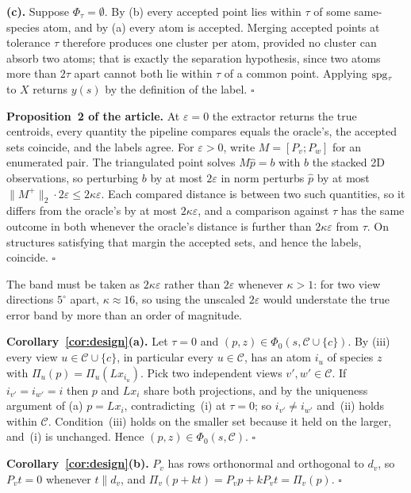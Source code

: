 \textbf{(c).} Suppose $\Phi_\tau = \emptyset$. By (b) every accepted point lies within $\tau$ of some
same-species atom, and by (a) every atom is accepted. Merging accepted points at tolerance $\tau$ therefore
produces one cluster per atom, provided no cluster can absorb two atoms; that is exactly the separation
hypothesis, since two atoms more than $2\tau$ apart cannot both lie within $\tau$ of a common point.
Applying $\mathrm{spg}_\tau$ to $X$ returns $y(s)$ by the definition of the label. \hfill$\square$

\textbf{Proposition~2 of the article.} At $\varepsilon = 0$ the extractor returns the true centroids, every
quantity the pipeline compares equals the oracle's, the accepted sets coincide, and the labels agree. For
$\varepsilon > 0$, write $M = [P_v; P_w]$ for an enumerated pair. The triangulated point solves
$M \hat p = b$ with $b$ the stacked 2D observations, so perturbing $b$ by at most $2\varepsilon$ in norm
perturbs $\hat p$ by at most $\|M^{+}\|_2 \cdot 2\varepsilon \le 2\kappa\varepsilon$. Each compared
distance is between two such quantities, so it differs from the oracle's by at most $2\kappa\varepsilon$,
and a comparison against $\tau$ has the same outcome in both whenever the oracle's distance is further than
$2\kappa\varepsilon$ from $\tau$. On structures satisfying that margin the accepted sets, and hence the
labels, coincide. \hfill$\square$

The band must be taken as $2\kappa\varepsilon$ rather than $2\varepsilon$ whenever $\kappa > 1$: for two view
directions $5^\circ$ apart, $\kappa \approx 16$, so using the unscaled $2\varepsilon$ would understate the
true error band by more than an order of magnitude.

\textbf{Corollary~\ref{cor:design}(a).} Let $\tau = 0$ and $(p,z) \in \Phi_0(s,\mathcal{C}\cup\{c\})$. By
(iii) every view $u \in \mathcal{C}\cup\{c\}$, in particular every $u \in \mathcal{C}$, has an atom $i_u$ of
species $z$ with $\Pi_u(p) = \Pi_u(L x_{i_u})$. Pick two independent views $v',w' \in \mathcal{C}$. If
$i_{v'} = i_{w'} = i$ then $p$ and $L x_i$ share both projections, and by the uniqueness argument of (a)
$p = L x_i$, contradicting~(i) at $\tau = 0$; so $i_{v'} \neq i_{w'}$ and~(ii) holds within $\mathcal{C}$.
Condition~(iii) holds on the smaller set because it held on the larger, and~(i) is unchanged. Hence
$(p,z) \in \Phi_0(s,\mathcal{C})$. \hfill$\square$

\textbf{Corollary~\ref{cor:design}(b).} $P_v$ has rows orthonormal and orthogonal to $d_v$, so $P_v t = 0$
whenever $t \parallel d_v$, and $\Pi_v(p + kt) = P_v p + k P_v t = \Pi_v(p)$. \hfill$\square$

